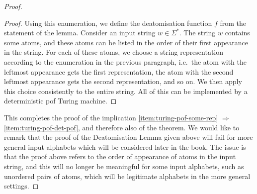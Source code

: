 \begin{proof}
\begin{proof}
        Using this enumeration, we define the deatomisation function $f$ from the statement of the lemma. 
        Consider an input string $w \in \Sigma^*$. The string $w$ contains some atoms, and these atoms can be listed in the order of their first appearance in the string. For each of these atoms, we choose a string representation according to the enumeration in the previous paragraph, i.e.~the atom with the leftmost appearance gets the first representation, the atom with the second leftmost appearance gets the second representation, and so on. We then apply this choice consistently to the entire string. All of this can be implemented by a deterministic pof Turing machine.
    \end{proof}

    This completes the proof of the implication \ref{item:turing-pof-some-rep} $\Rightarrow$ \ref{item:turing-pof-det-pof}, and therefore also of the theorem. We would like to remark that the proof of the Deatomisation Lemma given above will fail for more general input alphabets which will be considered later in the book. The issue is that the proof above refers to the order of appearance of atoms in the input string, and this will no longer be meaningful for some input alphabets, such as unordered pairs of atoms, which will be legitimate alphabets in the more general settings. 
\end{proof}






\exercisepart

